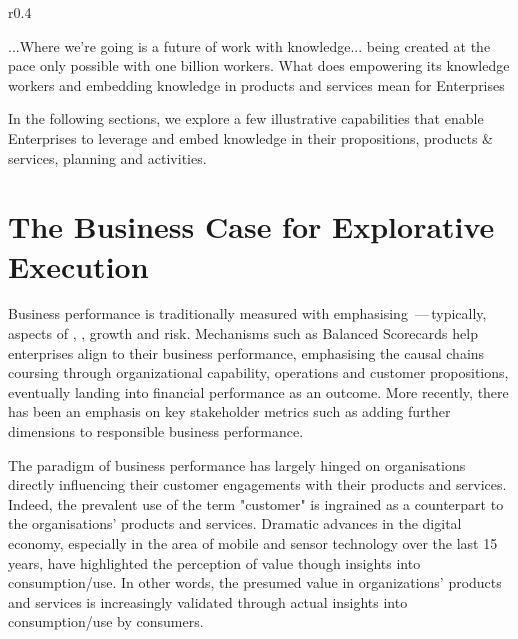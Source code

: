 \begin{wrapfigure}[9]{r}{0.4\textwidth}
    \vspace{-12pt}
    \begin{center}
        \begin{tcolorbox}[colback=secondary!5,colframe=secondary!60,title=2019\,---\,When we exceeded 1 billion Knowledge Workers]
            ...Where we’re going is a future of work with knowledge...
            being created at the pace only possible with one billion workers.
            What does empowering its knowledge workers and embedding knowledge in products and services mean for Enterprises
        \end{tcolorbox}
    \end{center}
\end{wrapfigure}

In the following sections, we explore a few illustrative capabilities that enable Enterprises to leverage and embed
knowledge in their propositions, products \& services, planning and activities.

\section*{The Business Case for Explorative Execution}

Business performance is traditionally measured with  emphasising
\,---\,typically, aspects of , ,
growth and risk.
Mechanisms such as Balanced Scorecards help enterprises align 
to their business performance, emphasising the causal chains coursing through organizational capability, operations and
customer propositions, eventually landing into financial performance as an outcome.
More recently, there has been an emphasis on key stakeholder metrics such as  adding further
dimensions to responsible business performance.

The paradigm of business performance has largely hinged on organisations directly influencing their customer
engagements with their products and services.
Indeed, the prevalent use of the term "customer" is ingrained as a counterpart to the organisations’
products and services.
Dramatic advances in the digital economy, especially in the area of mobile and sensor technology over the last 15 years,
have highlighted the perception of value though insights into consumption/use.
In other words, the presumed value in organizations’ products and services is increasingly validated through
actual insights into consumption/use by consumers.

